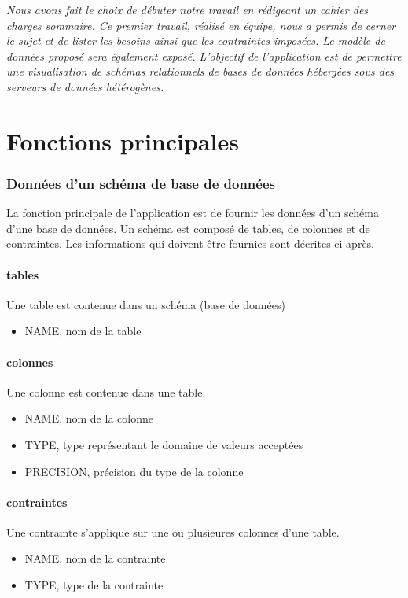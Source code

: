 \textit{Nous avons fait le choix de débuter notre travail en rédigeant un cahier des charges sommaire. Ce premier travail, réalisé en équipe, nous a permis de cerner le sujet et de lister les besoins ainsi que les contraintes imposées. Le modèle de données proposé sera également exposé. L’objectif de l'application est de permettre une visualisation de schémas relationnels de bases de données hébergées sous des serveurs de données hétérogènes.}


\section{Fonctions principales}
		\subsubsection{Données d'un schéma de base de données}
		La fonction principale de l'application est de fournir les données d'un schéma d'une base de données. Un schéma est composé de tables, de colonnes et de contraintes. Les informations qui doivent être fournies sont décrites ci-après.
		
			\paragraph{tables}
			Une table est contenue dans un schéma (base de données)
				\begin{itemize}
					\item NAME, nom de la table
				\end{itemize}
				
			\paragraph{colonnes}
			Une colonne est contenue dans une table.
				\begin{itemize}
					\item NAME, nom de la colonne
					\item TYPE, type représentant le domaine de valeurs acceptées
					\item PRECISION, précision du type de la colonne
				\end{itemize}
				
			\paragraph{contraintes}
			Une contrainte s'applique sur une ou plusieures colonnes d'une table.
				\begin{itemize}
					\item NAME, nom de la contrainte
					\item TYPE, type de la contrainte
				\end{itemize} 
				
